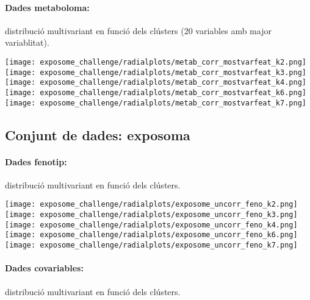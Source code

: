 \documentclass[CAT,BIB]{TFUOC}%
\begin{document}
            \paragraph{Dades metaboloma:} distribució multivariant en funció dels clústers (20 variables amb major variablitat).

            \begin{center}
                \texttt{[image: exposome\_challenge/radialplots/metab\_corr\_mostvarfeat\_k2.png]}
                \texttt{[image: exposome\_challenge/radialplots/metab\_corr\_mostvarfeat\_k3.png]}
                \texttt{[image: exposome\_challenge/radialplots/metab\_corr\_mostvarfeat\_k4.png]}
                \texttt{[image: exposome\_challenge/radialplots/metab\_corr\_mostvarfeat\_k6.png]}
                \texttt{[image: exposome\_challenge/radialplots/metab\_corr\_mostvarfeat\_k7.png]}
            \end{center}

        \subsection{Conjunt de dades: exposoma}

            \paragraph{Dades fenotip:} distribució multivariant en funció dels clústers.

            \begin{center}
                \texttt{[image: exposome\_challenge/radialplots/exposome\_uncorr\_feno\_k2.png]}
                \texttt{[image: exposome\_challenge/radialplots/exposome\_uncorr\_feno\_k3.png]}
                \texttt{[image: exposome\_challenge/radialplots/exposome\_uncorr\_feno\_k4.png]}
                \texttt{[image: exposome\_challenge/radialplots/exposome\_uncorr\_feno\_k6.png]}
                \texttt{[image: exposome\_challenge/radialplots/exposome\_uncorr\_feno\_k7.png]}
            \end{center}

            \paragraph{Dades covariables:} distribució multivariant en funció dels clústers.
\end{document}
